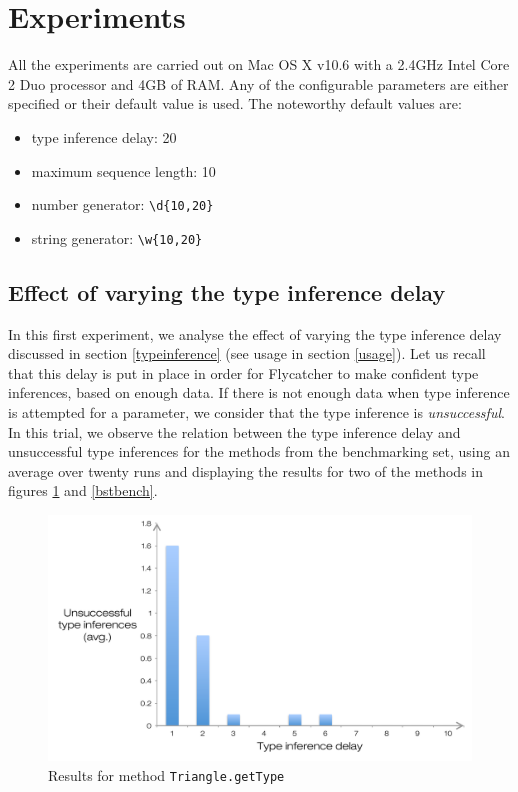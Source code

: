 \section{Experiments}
All the experiments are carried out on Mac OS X v10.6 with a 2.4GHz Intel Core 2 Duo processor and 4GB of RAM. Any of the configurable parameters are either specified or their default value is used. The noteworthy default values are:

\begin{itemize}
   \item type inference delay: 20
   \item maximum sequence length: 10
   \item number generator: \texttt{\textbackslash d\{10,20\}}
   \item string generator: \texttt{\textbackslash w\{10,20\}}
\end{itemize}

\subsection{Effect of varying the type inference delay}
In this first experiment, we analyse the effect of varying the type inference delay discussed in section \ref{typeinference} (see usage in section \ref{usage}). Let us recall that this delay is put in place in order for \textsf{Flycatcher} to make confident type inferences, based on enough data. If there is not enough data when type inference is attempted for a parameter, we consider that the type inference is \emph{unsuccessful}. In this trial, we observe the relation between the type inference delay and unsuccessful type inferences for the methods from the benchmarking set, using an average over twenty runs and displaying the results for two of the methods in figures \ref{trianglebench} and \ref{bstbench}.

\begin{figure}[h]
\hspace*{-0.5cm}
\centering
\includegraphics[scale=0.55]{./components/chapter7/triangle.pdf}
\caption{Results for method \texttt{Triangle.getType}}
\label{trianglebench}
\end{figure}

